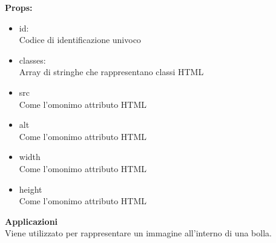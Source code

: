 \textbf{Props:} 
\begin{itemize}
\item id: 
\\
Codice di identificazione univoco
\item classes: 
\\
Array di stringhe che rappresentano classi HTML
\item src
\\
Come l'omonimo attributo HTML
\item alt
\\
Come l'omonimo attributo HTML
\item width
\\
Come l'omonimo attributo HTML
\item height
\\
Come l'omonimo attributo HTML

\end{itemize} 


\textbf{Applicazioni}\\
Viene utilizzato per rappresentare un immagine all'interno di una bolla. 


\clearpage

